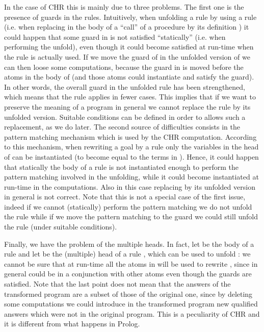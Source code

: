 \documentclass{tlp}
\begin{document}
In the case of CHR this is mainly
due to three problems. The first one is the presence of guards in the rules.
Intuitively, when
unfolding a rule  by using a rule  (i.e. when replacing in
the body of  a ``call'' of a procedure by its definition )
it could happen that some guard in  is not satisfied
``statically'' (i.e. when performing the unfold), even though it
could become satisfied at run-time when the  rule  is actually
used. If we move the guard of  in the unfolded version of 
we can then loose some computations, because the guard 
in  is moved before the atoms in the body of  (and those atoms could 
instantiate and satisfy the guard). In other words, the overall guard in the unfolded rule has been strengthened, which 
means that the rule applies in fewer cases. This implies that if we want to preserve the meaning
of a program in general we cannot replace the rule  by its unfolded
version. Suitable conditions can be defined in order to allows such a replacement, as we do later.
The second source of difficulties consists in the pattern matching
mechanism which is used by the CHR computation. According to this mechanism, when rewriting a goal  by a rule  only the variables in the head of  can be instantiated (to become equal to the terms in ).  Hence, it could happen that statically the body of a rule  is not instantiated enough to perform the pattern matching involved in the unfolding,  while it could become instantiated at run-time in the computations. Also in this case replacing  by its unfolded version in general is not correct. 
Note that this is not a special case of the first issue, indeed if we cannot (statically) perform the pattern matching we do not unfold the rule  
while if we move the pattern matching to the guard we could still unfold the rule (under suitable conditions).

Finally, we have the problem of the multiple heads.
In fact, let  be the body of a rule  and let  be the (multiple)
head of a rule , which can be used to unfold : we cannot be sure
that at run-time all the atoms in  will be used to rewrite ,
since in general  could be in a conjunction with other atoms even
though the guards are satisfied. 	
Note that the last point does not mean that the answers of the transformed program are a subset of those of the original one, since by deleting some computations we could introduce in the transformed program new qualified answers which were not in the original program. 
This is a peculiarity of CHR and it is different from what happens in Prolog.
\end{document}
